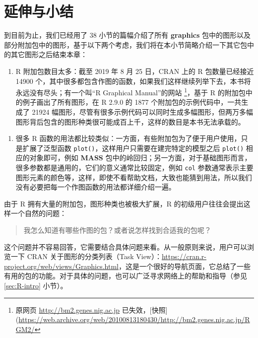 \documentclass[
  b5paper,
  UTF8,twoside]{book}
\providecommand{\tightlist}{%
  \setlength{\itemsep}{0pt}\setlength{\parskip}{0pt}}
\begin{document}
\hypertarget{sec:base-graph-ext}{%
\section{延伸与小结}\label{sec:base-graph-ext}}

到目前为止，我们已经用了 38 小节的篇幅介绍了所有 \textbf{graphics} 包中的图形以及部分附加包中的图形，基于以下两个考虑，我们将在本小节简略介绍一下其它包中的其它图形之后结束本章：

\begin{enumerate}
\def\labelenumi{\arabic{enumi}.}
\tightlist
\item
  R 附加包数目太多：截至 2019 年 8 月 25 日，CRAN 上的 R 包数量已经接近 14900 个，其中很多都包含作图的函数，如果我们这样继续列举下去，本书将永远没有尽头；有一个叫``R Graphical Manual''的网站 \footnote{原网页 \url{http://bm2.genes.nig.ac.jp} 已失效，{[}快照{]}(\url{https://web.archive.org/web/20100813180430/http://bm2.genes.nig.ac.jp/RGM2/}}，基于 R 的附加包中的例子画出了所有图形，在 R 2.9.0 的 1877 个附加包的示例代码中，一共生成了 21924 幅图形，尽管有很多示例代码可以同时生成多幅图形，但两万多幅图形背后包含的图形种类很可能成百上千，这样的数目是本书无法承载的。
\end{enumerate}

\begin{enumerate}
\def\labelenumi{\arabic{enumi}.}
\setcounter{enumi}{1}
\tightlist
\item
  很多 R 函数的用法都比较类似：一方面，有些附加包为了便于用户使用，只是扩展了泛型函数 \texttt{plot()}，这样用户只需要在建完特定的模型之后 \texttt{plot()} 相应的对象即可，例如 \textbf{MASS} 包中的岭回归；另一方面，对于基础图形而言，很多参数都是通用的，它们的意义通常比较固定，例如 \texttt{col} 参数通常表示主要图形元素的颜色等，这样，即使不看帮助文档，大致也能猜到用法，所以我们没有必要把每一个作图函数的用法都详细介绍一遍。
\end{enumerate}

由于 R 拥有大量的附加包，图形种类也被极大扩展，R 的初级用户往往会提出这样一个自然的问题：

\begin{quote}
我怎么知道有哪些作图的包？或者说怎样找到合适我的包呢？
\end{quote}

这个问题并不容易回答，它需要结合具体问题来看。从一般原则来说，用户可以浏览一下 CRAN 关于图形的分类列表（Task
View）：\url{https://cran.r-project.org/web/views/Graphics.html}，这是一个很好的导航页面，它总结了一些有用的包的功能。对于具体的问题，也可以广泛寻求网络上的帮助和指导（参见 \ref{sec:R-intro} 小节）。
\end{document}
